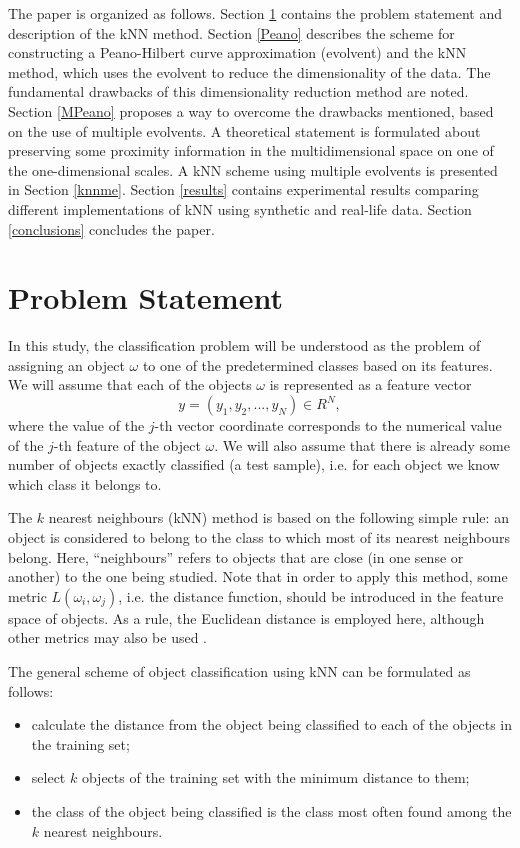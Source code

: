 \documentclass[entropy,article,submit,moreauthors,pdftex]{Definitions/mdpi}
\begin{document}
The paper is organized as follows. Section \ref{ps} contains the problem statement and description of the kNN method. Section \ref{Peano} describes the scheme for constructing a Peano-Hilbert curve approximation (evolvent) and the kNN method, which uses the evolvent to reduce the dimensionality of the data. The fundamental drawbacks of this dimensionality reduction method are noted. Section \ref{MPeano} proposes a way to overcome the drawbacks mentioned, based on the use of multiple evolvents. A theoretical statement is formulated about preserving some proximity information in the multidimensional space on one of the one-dimensional scales. A kNN scheme using multiple evolvents is presented in Section \ref{knnme}. Section \ref{results} contains experimental results comparing different implementations of kNN using synthetic and real-life data. Section \ref{conclusions} concludes the paper.


\section{Problem Statement}\label{ps}

In this study, the classification problem will be understood as the problem of assigning an object $\omega$  to one of the predetermined classes based on its features. We will assume that each of the objects $\omega$ is represented as a feature vector 
\begin{equation}
y = (y_1, y_2, ..., y_N) \in R^N,
\end{equation} 
where the value of the $j$-th vector coordinate corresponds to the numerical value of the $j$-th feature of the object $\omega$.
We will also assume that there is already some number of objects exactly classified (a test sample), i.e. for each object we know which class it belongs to.

The $k$ nearest neighbours (kNN) method is based on the following simple rule: an object is considered to belong to the class to which most of its nearest neighbours belong. Here, ``neighbours'' refers to objects that are close (in one sense or another) to the one being studied.
Note that in order to apply this method, some metric $L(\omega_i, \omega_j)$, i.e. the distance function, should be introduced in the feature space of objects. As a rule, the Euclidean distance is employed here, although other metrics may also be used \cite{Mirkes2020}.

The general scheme of object classification using kNN can be formulated as follows:
\begin{itemize}
\item calculate the distance from the object being classified to each of the objects in the training set;
\item select $k$ objects of the training set with the minimum distance to them;
\item the class of the object being classified is the class most often found among the $k$ nearest neighbours.
\end{itemize}
\end{document}
